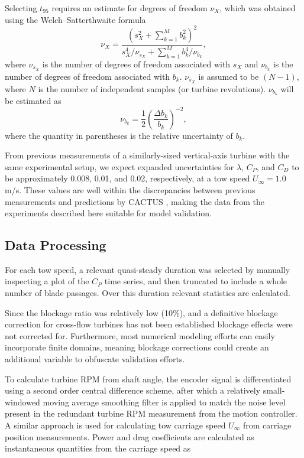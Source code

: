 \documentclass[10pt,letterpaper]{article}
\begin{document}
Selecting $t_{95}$ requires an estimate for degrees of freedom $\nu_X$, which
was obtained using the Welch--Satterthwaite formula
\begin{equation}
    \nu_X = \frac{\left(s_X^2 + \sum_{k=1}^M b_k^2 \right)^2} {s_X^4/\nu_{s_X} +
        \sum_{k=1}^M b_k^4/\nu_{b_k}},
\end{equation}
where $\nu_{s_X}$ is the number of degrees of freedom associated with $s_X$ and
$\nu_{b_k}$ is the number of degrees of freedom associated with $b_k$.
$\nu_{s_X}$ is assumed to be $(N-1)$, where $N$ is the number of independent
samples (or turbine revolutions). $\nu_{b_k}$ will be estimated as
\begin{equation}
    \nu_{b_k} = \frac{1}{2} \left( \frac{\Delta b_k}{b_k} \right)^{-2},
\end{equation}
where the quantity in parentheses is the relative uncertainty of $b_k$.

From previous measurements of a similarly-sized vertical-axis turbine with the
same experimental setup, we expect expanded uncertainties for $\lambda$, $C_P$,
and $C_D$ to be approximately 0.008, 0.01, and 0.02, respectively, at a tow
speed $U_\infty = 1.0$ m/s. These values are well within the discrepancies
between previous measurements and predictions by CACTUS \cite{Michelen2014},
making the data from the experiments described here suitable for model validation.


\subsection*{Data Processing}

For each tow speed, a relevant quasi-steady duration was selected by manually
inspecting a plot of the $C_P$ time series, and then truncated to include a
whole number of blade passages. Over this duration relevant statistics are
calculated. 

Since the blockage ratio was relatively low (10\%), and a definitive blockage
correction for cross-flow turbines has not been established \cite{Cavagnaro2014}
blockage effects were not corrected for. Furthermore, most numerical modeling
efforts can easily incorporate finite domains, meaning blockage corrections
could create an additional variable to obfuscate validation efforts.

To calculate turbine RPM from shaft angle, the encoder signal is differentiated
using a second order central difference scheme, after which a relatively
small-windowed moving average smoothing filter is applied to match the noise
level present in the redundant turbine RPM measurement from the motion
controller. A similar approach is used for calculating tow carriage speed
$U_\infty$ from carriage position measurements. Power and drag coefficients are
calculated as instantaneous quantities from the carriage speed as
\end{document}
